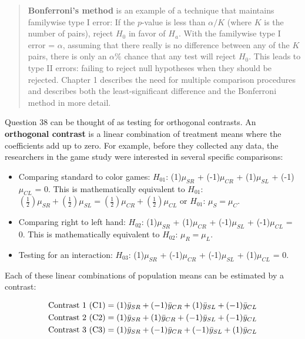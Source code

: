 \documentclass[
]{book}
\providecommand{\tightlist}{%
  \setlength{\itemsep}{0pt}\setlength{\parskip}{0pt}}
\begin{document}
\begin{quote}
\textbf{Bonferroni's method} is an example of a technique that maintains familywise type I error: If the \(p\)-value is less than \(\alpha/K\) (where \(K\) is the number of pairs), reject \(H_0\) in favor of \(H_a\). With the familywise type I error = \(\alpha\), assuming that there really is no difference between any of the \(K\) pairs, there is only an \(\alpha\%\) chance that any test will reject \(H_0\). This leads to type II errors: failing to reject null hypotheses when they should be rejected. Chapter 1 describes the need for multiple comparison procedures and describes both the least-significant difference and the Bonferroni method in more detail.
\end{quote}

Question 38 can be thought of as testing for orthogonal contrasts. An \textbf{orthogonal contrast} is a linear combination of treatment means where the coefficients add up to zero. For example, before they collected any data, the researchers in the game study were interested in several specific comparisons:

\begin{itemize}
\tightlist
\item
  Comparing standard to color games: \(H_{01}\): (1)\(\mu_{SR}\) + (-1)\(\mu_{CR}\) + (1)\(\mu_{SL}\) + (-1)\(\mu_{CL}\) = 0. This is mathematically equivalent to \(H_{01}\): \((\frac{1}{2})\mu_{SR} + (\frac{1}{2})\mu_{SL} = (\frac{1}{2})\mu_{CR} + (\frac{1}{2})\mu_{CL}\) or \(H_{01}\): \(\mu_{S} = \mu_{C}\).
\item
  Comparing right to left hand: \(H_{02}\): (1)\(\mu_{SR}\) + (1)\(\mu_{CR}\) + (-1)\(\mu_{SL}\) + (-1)\(\mu_{CL}\) = 0. This is mathematically equivalent to \(H_{02}\): \(\mu_{R} = \mu_{L}\).
\item
  Testing for an interaction: \(H_{03}\): (1)\(\mu_{SR}\) + (-1)\(\mu_{CR}\) + (-1)\(\mu_{SL}\) + (1)\(\mu_{CL}\) = 0.
\end{itemize}

Each of these linear combinations of population means can be estimated by a contrast:

\begin{align}
\text{Contrast 1 (C1)} &= (1)\bar{y}_{SR} + (-1)\bar{y}_{CR} + (1)\bar{y}_{SL} + (-1)\bar{y}_{CL} \notag \\
\text{Contrast 2 (C2)} &= (1)\bar{y}_{SR} + (1)\bar{y}_{CR} + (-1)\bar{y}_{SL} + (-1)\bar{y}_{CL} \notag \\
\text{Contrast 3 (C3)} &= (1)\bar{y}_{SR} + (-1)\bar{y}_{CR} + (-1)\bar{y}_{SL} + (1)\bar{y}_{CL}
\notag
\end{align}
\end{document}
